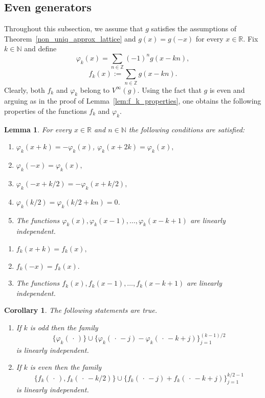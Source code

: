 \documentclass[12pt]{amsart}
\numberwithin{equation}{section}
\newtheorem{lemma}[theorem]{Lemma}
\newtheorem{corollary}[theorem]{Corollary} \newcommand{\La}{\Lambda}
\newcommand{\R}{{\mathbb R}} \newcommand{\Q}{{\mathbb Q}} \newcommand{\Z}{{\mathbb Z}} \newcommand{\N}{{\mathbb N}}
\begin{document}
\subsection{Even generators}
Throughout this subsection, we assume that $g$ satisfies the assumptions of Theorem~\ref{non_uniq_approx_lattice} and $g(x)=g(-x)$ for every $x\in \R.$ 
Fix $k \in \N$ and define 
$$
\varphi_k(x) = \sum\limits_{n \in \Z} (-1)^n g(x-kn),
$$
$$f_k(x):=\sum_{n\in\Z}g(x-kn).$$
Clearly, both $f_k$ and $\varphi_k$ belong to $V^\infty(g)$. Using the fact that $g$ is even and arguing as in the proof of Lemma~\ref{lem:f_k_properties}, one obtains the following properties of the functions $f_k$ and $\varphi_k$.

\begin{lemma}\label{lem:fk_phi_k} For every $x\in\R$ and $n\in\N$ the following conditions are satisfied:
    \begin{enumerate}
    \item[$(B_1)$] $\varphi_k(x+k) = -\varphi_k(x)$, $\varphi_k(x+2k) = \varphi_k(x),$
    \item[$(B2)$] $\varphi_k(-x) = \varphi_k(x),$
    \item[$(B_3)$] $\varphi_k(-x+k/2) = -\varphi_k(x+k/2),$
    \item[$(B_4)$] $\varphi_k(k/2) = \varphi_k(k/2 + kn) = 0$.
  \item[$(B_5)$] The functions $\varphi_k(x),\varphi_k(x-1),\dots,\varphi_k(x-k+1)$ are linearly independent.
\end{enumerate}
\begin{enumerate}
    \item[$(C_1)$] $f_k(x+k) = f_k(x),$
    \item[$(C_2)$] $f_k(-x) = f_k(x).$
    \item[$(C_3)$] The functions $f_k(x),f_k(x-1),\dots,f_k(x-k+1)$ are linearly independent.
\end{enumerate}
\end{lemma}

\begin{corollary}\label{lem:phi_f_linear_independence} The following statements are true.
\begin{enumerate} 
    \item[$(i)$] If $k$ is odd then the family
    $$\{\varphi_k(\,\cdot\, )\}\cup \{\varphi_k(\,\cdot\,- j)- \varphi_k(\,\cdot\,-k + j)\}_{j=1}^{(k-1)/2}$$
is linearly independent. 
    \item[$(ii)$]
    If $k$ is even then the family
    $$\{f_k(\,\cdot\, ), f_k(\,\cdot\, -k/2)\}\cup \{f_k(\,\cdot\,- j)+ f_k(\,\cdot\,-k + j)\}_{j=1}^{k/2-1}$$
is linearly independent. 
       
\end{enumerate}
   
\end{corollary}
\end{document}
